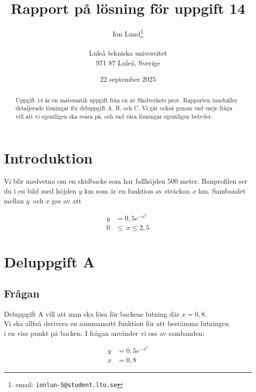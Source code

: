 \documentclass[a4paper,12pt]{article}
\title{Rapport på lösning för uppgift 14}
\author{Ion Lund\thanks{email:
        \texttt{ionlun-5@student.ltu.se}}\\  
        ~ \\
        Luleå tekniska universitet \\ 
        971 87 Luleå, Sverige}
\date{22 september 2025}
\begin{document}
\linenumbers %

\maketitle

\begin{abstract}
  Uppgift 14 är en matematik uppgift från en av Skolverkets prov.
  \cite{Skolverk} Rapporten innehåller detaljerade lösningar för deluppgift 
  A, B, och C. Vi går också genom vad varje fråga vill att vi egentligen ska 
  svara på, och vad våra lösningar egentligen betyder.
\end{abstract}

\section{Introduktion}
  \label{sec:introduktion}

    Vi blir medvetna om en skidbacke som har fallhöjden 500 meter. Banprofilen 
    ser du i en bild med höjden $y$ km som är en funktion av sträckan $x$ km.
    \cite{Skolverk} Sambandet mellan $y$ och $x$ ges av att 

    \begin{align}
      y &= 0,5e^{-x^2} \nonumber 
      \\
      0 &\le~x \le 2,5 \nonumber
    \end{align}

\section{Deluppgift A}

  \label{sec:uppg1}

    \subsection{Frågan}

      Deluppgift A \cite{Skolverk} vill att man ska lösa för backens lutning där
      $x = 0,8$.
      \\
      Vi ska alltså derivera en sammansatt funktion för att bestämma lutningen 
      \\
      i en viss punkt på backen. I frågan använder vi oss av sambanden:

      \begin{align}
        y &= 0,5e^{-x^2} \nonumber 
        \\
        x &= 0,8 \nonumber
      \end{align}
\end{document}
